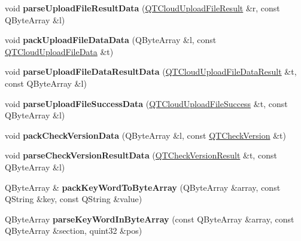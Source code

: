 \begin{DoxyCompactItemize}
\mbox{\label{class_q_q_t_cloud_protocol_a3c9790aff8d44cf3314a1c3cffe0cfb4}} 
void {\bfseries parse\+Upload\+File\+Result\+Data} (\mbox{\hyperlink{structtag_tank_upload_file_result}{Q\+T\+Cloud\+Upload\+File\+Result}} \&r, const Q\+Byte\+Array \&l)
\item 
\mbox{\label{class_q_q_t_cloud_protocol_a13683f7ebb953db22c0a8c52480a889e}} 
void {\bfseries pack\+Upload\+File\+Data\+Data} (Q\+Byte\+Array \&l, const \mbox{\hyperlink{structtag_q_t_cloud_down_file_data_result}{Q\+T\+Cloud\+Upload\+File\+Data}} \&t)
\item 
\mbox{\label{class_q_q_t_cloud_protocol_a6e9201ebfe3e95204785248edf8ecd71}} 
void {\bfseries parse\+Upload\+File\+Data\+Result\+Data} (\mbox{\hyperlink{structtag_q_t_cloud_down_file_data}{Q\+T\+Cloud\+Upload\+File\+Data\+Result}} \&t, const Q\+Byte\+Array \&l)
\item 
\mbox{\label{class_q_q_t_cloud_protocol_aaf27b02485f2c16af965209dda1be175}} 
void {\bfseries parse\+Upload\+File\+Success\+Data} (\mbox{\hyperlink{structtag_q_t_cloud_cancel_down_file}{Q\+T\+Cloud\+Upload\+File\+Success}} \&t, const Q\+Byte\+Array \&l)
\item 
\mbox{\label{class_q_q_t_cloud_protocol_aa0c52274a5397bdb3c2ebd34f6559312}} 
void {\bfseries pack\+Check\+Version\+Data} (Q\+Byte\+Array \&l, const \mbox{\hyperlink{structtag_q_t_check_version}{Q\+T\+Check\+Version}} \&t)
\item 
\mbox{\label{class_q_q_t_cloud_protocol_a3f4ea670c35546d66239730e3e9416e1}} 
void {\bfseries parse\+Check\+Version\+Result\+Data} (\mbox{\hyperlink{structtag_q_t_check_version_result}{Q\+T\+Check\+Version\+Result}} \&t, const Q\+Byte\+Array \&l)
\item 
\mbox{\label{class_q_q_t_cloud_protocol_aa66b9a315b2593cf07356bfde94ac9be}} 
Q\+Byte\+Array \& {\bfseries pack\+Key\+Word\+To\+Byte\+Array} (Q\+Byte\+Array \&array, const Q\+String \&key, const Q\+String \&value)
\item 
\mbox{\label{class_q_q_t_cloud_protocol_a55e4cc6a0a6ced709f5cf846b3a0cdce}} 
Q\+Byte\+Array {\bfseries parse\+Key\+Word\+In\+Byte\+Array} (const Q\+Byte\+Array \&array, const Q\+Byte\+Array \&section, quint32 \&pos)
\end{DoxyCompactItemize}
